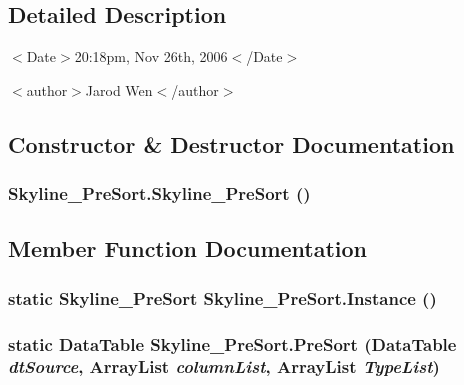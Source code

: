 \subsection{Detailed Description}
$<$Date$>$20:18pm, Nov 26th, 2006$<$/Date$>$ 

$<$author$>$Jarod Wen$<$/author$>$ 



\subsection{Constructor \& Destructor Documentation}
\subsubsection{\setlength{\rightskip}{0pt plus 5cm}Skyline\_\-Pre\-Sort.Skyline\_\-Pre\-Sort ()}\label{class_skyline___pre_sort_8e61538e8449047c2ebadffef7b4a0ad}




\subsection{Member Function Documentation}
\subsubsection{\setlength{\rightskip}{0pt plus 5cm}static {\bf Skyline\_\-Pre\-Sort} Skyline\_\-Pre\-Sort.Instance ()\hspace{0.3cm}{\tt  [static]}}\label{class_skyline___pre_sort_ae4b3d114e72653c2b3259b812416397}


\subsubsection{\setlength{\rightskip}{0pt plus 5cm}static Data\-Table Skyline\_\-Pre\-Sort.Pre\-Sort (Data\-Table {\em dt\-Source}, Array\-List {\em column\-List}, Array\-List {\em Type\-List})\hspace{0.3cm}{\tt  [static, private]}}\label{class_skyline___pre_sort_7f8ce8e206aef7b6503c195a30ee2443}


